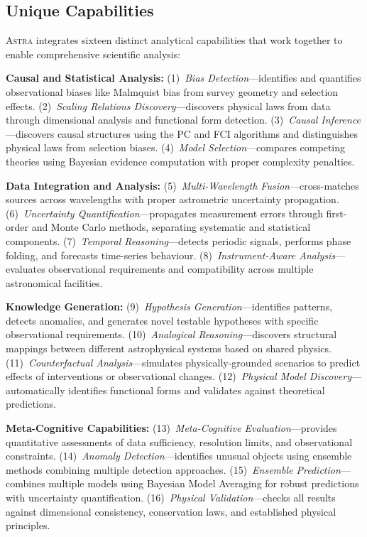 \documentclass[usenatbib]{rasti}
\newcommand{\astra}{\textsc{Astra}\xspace}
\newcommand{\pc}{PC\xspace}
\newcommand{\fci}{FCI\xspace}
\begin{document}
\subsection{Unique Capabilities}
\label{sec:methods:capabilities}

\astra integrates sixteen distinct analytical capabilities that work together to enable comprehensive scientific analysis:

\textbf{Causal and Statistical Analysis:}
(1)~\emph{Bias Detection}---identifies and quantifies observational biases like Malmquist bias from survey geometry and selection effects.
(2)~\emph{Scaling Relations Discovery}---discovers physical laws from data through dimensional analysis and functional form detection.
(3)~\emph{Causal Inference}---discovers causal structures using the \pc and \fci algorithms \citep{Spirtes2000,Zhang2008} and distinguishes physical laws from selection biases.
(4)~\emph{Model Selection}---compares competing theories using Bayesian evidence computation with proper complexity penalties.

\textbf{Data Integration and Analysis:}
(5)~\emph{Multi-Wavelength Fusion}---cross-matches sources across wavelengths with proper astrometric uncertainty propagation.
(6)~\emph{Uncertainty Quantification}---propagates measurement errors through first-order and Monte Carlo methods, separating systematic and statistical components.
(7)~\emph{Temporal Reasoning}---detects periodic signals, performs phase folding, and forecasts time-series behaviour.
(8)~\emph{Instrument-Aware Analysis}---evaluates observational requirements and compatibility across multiple astronomical facilities.

\textbf{Knowledge Generation:}
(9)~\emph{Hypothesis Generation}---identifies patterns, detects anomalies, and generates novel testable hypotheses with specific observational requirements.
(10)~\emph{Analogical Reasoning}---discovers structural mappings between different astrophysical systems based on shared physics.
(11)~\emph{Counterfactual Analysis}---simulates physically-grounded scenarios to predict effects of interventions or observational changes.
(12)~\emph{Physical Model Discovery}---automatically identifies functional forms and validates against theoretical predictions.

\textbf{Meta-Cognitive Capabilities:}
(13)~\emph{Meta-Cognitive Evaluation}---provides quantitative assessments of data sufficiency, resolution limits, and observational constraints.
(14)~\emph{Anomaly Detection}---identifies unusual objects using ensemble methods combining multiple detection approaches.
(15)~\emph{Ensemble Prediction}---combines multiple models using Bayesian Model Averaging for robust predictions with uncertainty quantification.
(16)~\emph{Physical Validation}---checks all results against dimensional consistency, conservation laws, and established physical principles.
\end{document}
